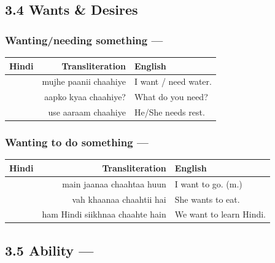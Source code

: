 \subsection{3.4 Wants \& Desires}

\subsubsection*{Wanting/needing something — }


\begin{tabular}{@{}HRG@{}}
  \toprule
  Hindi & Transliteration & English \\
  \midrule
          & mujhe paanii chaahiye    & I want / need water. \\
          & aapko kyaa chaahiye?     & What do you need? \\
           & use aaraam chaahiye      & He/She needs rest. \\
  \bottomrule
\end{tabular}

\subsubsection*{Wanting to do something — }


\begin{tabular}{@{}HRG@{}}
  \toprule
  Hindi & Transliteration & English \\
  \midrule
       & main jaanaa chaahtaa huun & I want to go. (m.) \\
         & vah khaanaa chaahtii hai   & She wants to eat. \\
   & ham Hindi siikhnaa chaahte hain & We want to learn Hindi. \\
  \bottomrule
\end{tabular}

\subsection{3.5 Ability — }

